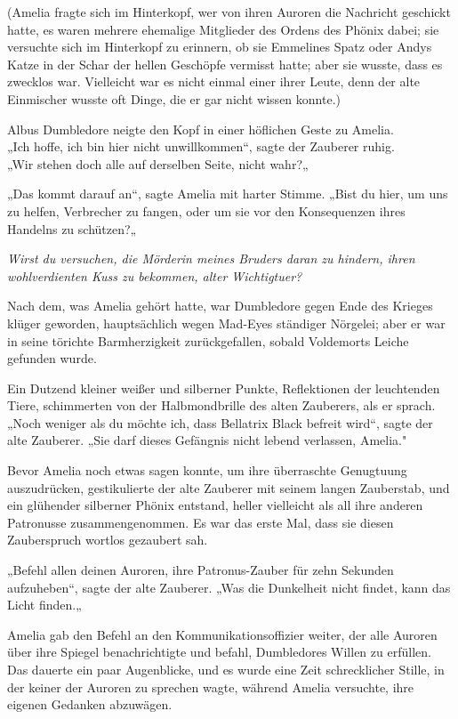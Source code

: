 {(Amelia fragte sich im Hinterkopf, wer von ihren Auroren die Nachricht geschickt hatte, es waren mehrere ehemalige Mitglieder des Ordens des Phönix dabei; sie versuchte sich im Hinterkopf zu erinnern, ob sie Emmelines Spatz oder Andys Katze in der Schar der hellen Geschöpfe vermisst hatte; aber sie wusste, dass es zwecklos war. Vielleicht war es nicht einmal einer ihrer Leute, denn der alte Einmischer wusste oft Dinge, die er gar nicht wissen konnte.)

Albus Dumbledore neigte den Kopf in einer höflichen Geste zu Amelia.\\ „Ich hoffe, ich bin hier nicht unwillkommen“, sagte der Zauberer ruhig.\\ „Wir stehen doch alle auf derselben Seite, nicht wahr?„

„Das kommt darauf an“, sagte Amelia mit harter Stimme. „Bist du hier, um uns zu helfen, Verbrecher zu fangen, oder um sie vor den Konsequenzen ihres Handelns zu schützen?„

\emph{Wirst du versuchen, die Mörderin meines Bruders daran zu hindern, ihren wohlverdienten Kuss zu bekommen, alter Wichtigtuer?}

Nach dem, was Amelia gehört hatte, war Dumbledore gegen Ende des Krieges klüger geworden, hauptsächlich wegen Mad-Eyes ständiger Nörgelei; aber er war in seine törichte Barmherzigkeit zurückgefallen, sobald Voldemorts Leiche gefunden wurde.

Ein Dutzend kleiner weißer und silberner Punkte, Reflektionen der leuchtenden Tiere, schimmerten von der Halbmondbrille des alten Zauberers, als er sprach.\\ „Noch weniger als du möchte ich, dass Bellatrix Black befreit wird“, sagte der alte Zauberer. „Sie darf dieses Gefängnis nicht lebend verlassen, Amelia."

Bevor Amelia noch etwas sagen konnte, um ihre überraschte Genugtuung auszudrücken, gestikulierte der alte Zauberer mit seinem langen Zauberstab, und ein glühender silberner Phönix entstand, heller vielleicht als all ihre anderen Patronusse zusammengenommen. Es war das erste Mal, dass sie diesen Zauberspruch wortlos gezaubert sah.

„Befehl allen deinen Auroren, ihre Patronus-Zauber für zehn Sekunden aufzuheben“, sagte der alte Zauberer. „Was die Dunkelheit nicht findet, kann das Licht finden.„

Amelia gab den Befehl an den Kommunikationsoffizier weiter, der alle Auroren über ihre Spiegel benachrichtigte und befahl, Dumbledores Willen zu erfüllen. Das dauerte ein paar Augenblicke, und es wurde eine Zeit schrecklicher Stille, in der keiner der Auroren zu sprechen wagte, während Amelia versuchte, ihre eigenen Gedanken abzuwägen.

}
